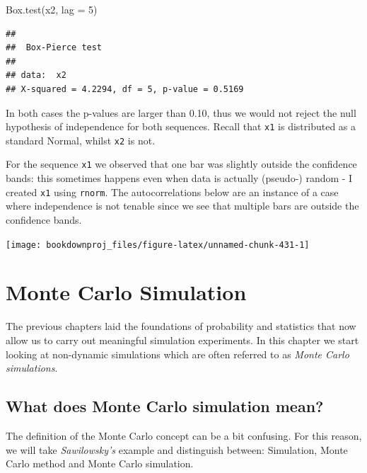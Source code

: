 \documentclass[
]{book}
\newenvironment{Shaded}{\begin{snugshade}}{\end{snugshade}}
\newcommand{\AttributeTok}[1]{\textcolor[rgb]{0.77,0.63,0.00}{#1}}
\newcommand{\DecValTok}[1]{\textcolor[rgb]{0.00,0.00,0.81}{#1}}
\newcommand{\FunctionTok}[1]{\textcolor[rgb]{0.00,0.00,0.00}{#1}}
\newcommand{\NormalTok}[1]{#1}
\theoremstyle{definition}
\theoremstyle{definition}
\theoremstyle{definition}
\theoremstyle{definition}
\theoremstyle{remark}
\begin{document}
\begin{Shaded}
\begin{Highlighting}[]
\FunctionTok{Box.test}\NormalTok{(x2, }\AttributeTok{lag =} \DecValTok{5}\NormalTok{)}
\end{Highlighting}
\end{Shaded}

\begin{verbatim}
## 
##  Box-Pierce test
## 
## data:  x2
## X-squared = 4.2294, df = 5, p-value = 0.5169
\end{verbatim}

In both cases the p-values are larger than 0.10, thus we would not reject the null hypothesis of independence for both sequences. Recall that \texttt{x1} is distributed as a standard Normal, whilst \texttt{x2} is not.

For the sequence \texttt{x1} we observed that one bar was slightly outside the confidence bands: this sometimes happens even when data is actually (pseudo-) random - I created \texttt{x1} using \texttt{rnorm}. The autocorrelations below are an instance of a case where independence is not tenable since we see that multiple bars are outside the confidence bands.

\begin{center}\texttt{[image: bookdownproj\_files/figure-latex/unnamed-chunk-431-1]} \end{center}

\hypertarget{monte-carlo-simulation}{%
\chapter{Monte Carlo Simulation}\label{monte-carlo-simulation}}

The previous chapters laid the foundations of probability and statistics that now allow us to carry out meaningful simulation experiments. In this chapter we start looking at non-dynamic simulations which are often referred to as \emph{Monte Carlo simulations}.

\hypertarget{what-does-monte-carlo-simulation-mean}{%
\section{What does Monte Carlo simulation mean?}\label{what-does-monte-carlo-simulation-mean}}

The definition of the Monte Carlo concept can be a bit confusing. For this reason, we will take \emph{Sawilowsky's} example and distinguish between: Simulation, Monte Carlo method and Monte Carlo simulation.
\end{document}
